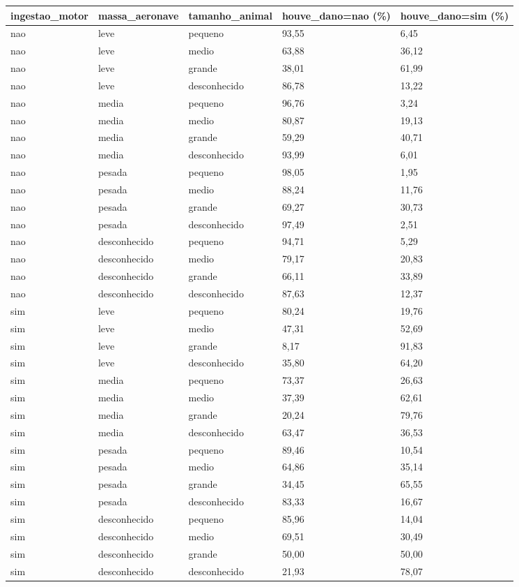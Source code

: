 \begin{tabular}{lllll}
\toprule
ingestao\_motor & massa\_aeronave & tamanho\_animal & houve\_dano=nao (\%) & houve\_dano=sim (\%) \\
\midrule
nao & leve & pequeno & 93,55 & 6,45 \\
nao & leve & medio & 63,88 & 36,12 \\
nao & leve & grande & 38,01 & 61,99 \\
nao & leve & desconhecido & 86,78 & 13,22 \\
nao & media & pequeno & 96,76 & 3,24 \\
nao & media & medio & 80,87 & 19,13 \\
nao & media & grande & 59,29 & 40,71 \\
nao & media & desconhecido & 93,99 & 6,01 \\
nao & pesada & pequeno & 98,05 & 1,95 \\
nao & pesada & medio & 88,24 & 11,76 \\
nao & pesada & grande & 69,27 & 30,73 \\
nao & pesada & desconhecido & 97,49 & 2,51 \\
nao & desconhecido & pequeno & 94,71 & 5,29 \\
nao & desconhecido & medio & 79,17 & 20,83 \\
nao & desconhecido & grande & 66,11 & 33,89 \\
nao & desconhecido & desconhecido & 87,63 & 12,37 \\
sim & leve & pequeno & 80,24 & 19,76 \\
sim & leve & medio & 47,31 & 52,69 \\
sim & leve & grande & 8,17 & 91,83 \\
sim & leve & desconhecido & 35,80 & 64,20 \\
sim & media & pequeno & 73,37 & 26,63 \\
sim & media & medio & 37,39 & 62,61 \\
sim & media & grande & 20,24 & 79,76 \\
sim & media & desconhecido & 63,47 & 36,53 \\
sim & pesada & pequeno & 89,46 & 10,54 \\
sim & pesada & medio & 64,86 & 35,14 \\
sim & pesada & grande & 34,45 & 65,55 \\
sim & pesada & desconhecido & 83,33 & 16,67 \\
sim & desconhecido & pequeno & 85,96 & 14,04 \\
sim & desconhecido & medio & 69,51 & 30,49 \\
sim & desconhecido & grande & 50,00 & 50,00 \\
sim & desconhecido & desconhecido & 21,93 & 78,07 \\
\bottomrule
\end{tabular}
